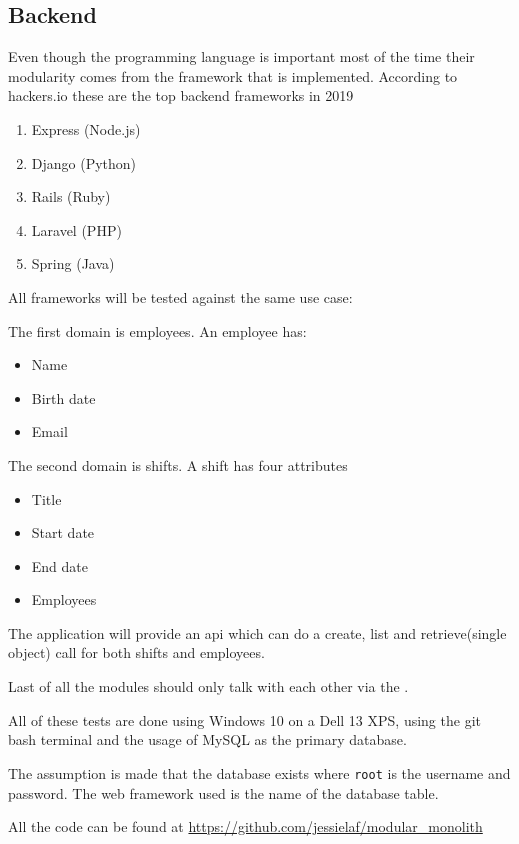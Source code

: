 \subsection{Backend}
\label{sec:BackendImplementation}

Even though the programming language is important most of the time their modularity comes from the framework that is implemented. According to hackers.io these are the top backend frameworks in 2019 \cite{topFrameworks}

\begin{enumerate}
    \item Express (Node.js)
    \item Django (Python)
    \item Rails (Ruby)
    \item Laravel (PHP)
    \item Spring (Java)
\end{enumerate}

All frameworks will be tested against the same use case:

The first domain is employees. An employee has:
\begin{itemize}
    \item Name
    \item Birth date
    \item Email
\end{itemize}

The second domain is shifts. A shift has four attributes
\begin{itemize}
    \item Title
    \item Start date
    \item End date
    \item Employees
\end{itemize}

The application will provide an api which can do a create, list and retrieve(single object) call for both shifts and employees.

Last of all the modules should only talk with each other via the .

All of these tests are done using Windows 10 on a Dell 13 XPS, using the git bash terminal and the usage of MySQL as the primary database.

The assumption is made that the database exists where \texttt{root} is the username and password. The web framework used is the name of the database table.

All the code can be found at \url{https://github.com/jessielaf/modular_monolith}

